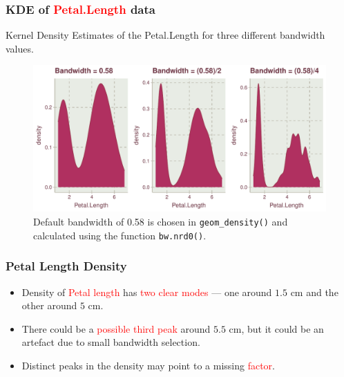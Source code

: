 \documentclass{beamer}
\begin{document}
\begin{frame}\frametitle{KDE of \textcolor{red}{Petal.Length}  data}
Kernel Density Estimates of the Petal.Length for three different bandwidth values.
\begin{figure}
\includegraphics[width=0.99\linewidth]{PlotsLec1/KDEPetalLength}
\caption{{\small Default bandwidth of 0.58 is chosen in \texttt{geom\_density()} and calculated using the function \texttt{bw.nrd0()}}.}
\end{figure}
\end{frame}

\begin{frame}\frametitle{Petal Length Density}
\begin{itemize}
\item Density of \textcolor{red}{Petal length} has \textcolor{red}{two clear modes} --- one around $1.5$ cm and the other around $5$ cm. 
\vspace{0.3in}
\item There could be a \textcolor{red}{possible third peak} around $5.5$ cm, but it could be an artefact due to small bandwidth selection.
\vspace{0.3in}
\item Distinct peaks in the density may point to a missing \textcolor{red}{factor}.
\end{itemize}
\end{frame}
\end{document}
